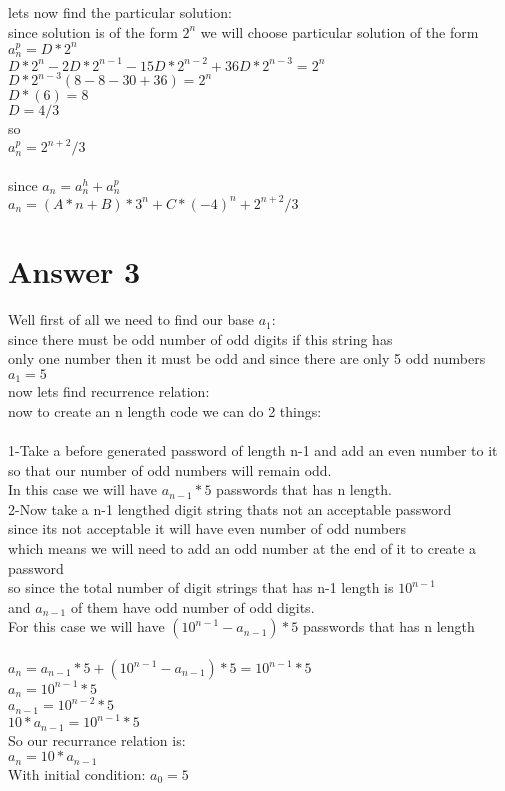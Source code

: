 \documentclass[11pt]{article}
\begin{document}
lets now find the particular solution:\\
since solution is of the form $2^{n}$ we will choose particular solution of the form $a_n^{p}=D*2^{n}$\\
$D*2^{n}-2D*2^{n-1}-15D*2^{n-2}+36D*2^{n-3}=2^{n}$\\
$D*2^{n-3}(8-8-30+36)=2^{n}$\\
$D*(6)=8$\\
$D=4/3$\\
so\\
$a_n^{p}=2^{n+2}/3$\\
\\
since $a_n=a_n^{h}+a_n^{p}$\\
$a_n=(A*n+B)*3^{n}+C*(-4)^n+2^{n+2}/3$\\







\section*{Answer 3}
Well first of all we need to find our base $a_1$:\\
since there must be odd number of odd digits if this string has\\
only one number then it must be odd and since there are only 5 odd numbers\\
$a_1=5$\\
now lets find recurrence relation:\\
now to create an n length code we can do 2 things:\\
\\
1-Take a before generated password of length n-1 and add an even number to it\\
so that our number of odd numbers will remain odd.\\
In this case we will have $a_{n-1}*5$ passwords that has n length.
\\
2-Now take a n-1 lengthed digit string thats not an acceptable password\\
since its not acceptable it will have even number of odd numbers\\
which means we will need to add an odd number at the end of it to create a password\\
so since the total number of digit strings that has n-1 length is $10^{n-1}$\\
and $a_{n-1}$ of them have odd number of odd digits.\\
For this case we will have $(10^{n-1}-a_{n-1})*5$ passwords that has n length\\
\\
$a_{n}=a_{n-1}*5+(10^{n-1}-a_{n-1})*5=10^{n-1}*5$\\
$a_{n}=10^{n-1}*5$\\
$a_{n-1}=10^{n-2}*5$\\
$10*a_{n-1}=10^{n-1}*5$\\
So our recurrance relation is:\\
$a_{n}=10*a_{n-1}$\\
With initial condition: $a_{0}=5$
\end{document}
